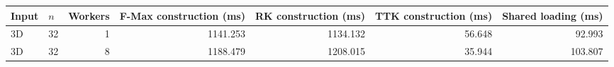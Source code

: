 \begin{tabular}{llrrrrr}
\hline
Input & $n$ & Workers & F-Max construction (ms) & RK construction (ms) & TTK construction (ms) & Shared loading (ms) \\
\hline
3D & 32 & 1 & 1141.253 & 1134.132 & 56.648 & 92.993 \\
3D & 32 & 8 & 1188.479 & 1208.015 & 35.944 & 103.807 \\
\hline
\end{tabular}
